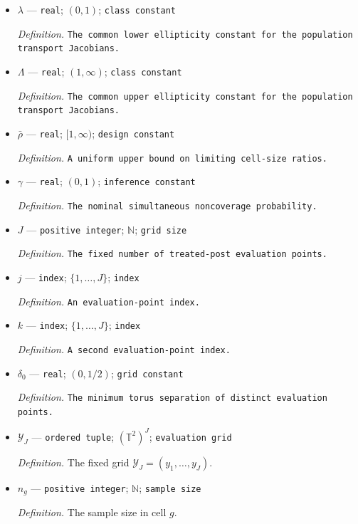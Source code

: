\documentclass{article}
\begin{document}
\begin{itemize}
  \item \(\lambda\) --- \texttt{real}; \((0,1)\); \texttt{class constant}
  \par\smallskip\noindent\emph{Definition.} \texttt{The common lower ellipticity constant for the population transport Jacobians.}
  \item \(\Lambda\) --- \texttt{real}; \((1,\infty)\); \texttt{class constant}
  \par\smallskip\noindent\emph{Definition.} \texttt{The common upper ellipticity constant for the population transport Jacobians.}
  \item \(\bar\rho\) --- \texttt{real}; \([1,\infty)\); \texttt{design constant}
  \par\smallskip\noindent\emph{Definition.} \texttt{A uniform upper bound on limiting cell-\allowbreak{}size ratios.}
  \item \(\gamma\) --- \texttt{real}; \((0,1)\); \texttt{inference constant}
  \par\smallskip\noindent\emph{Definition.} \texttt{The nominal simultaneous noncoverage probability.}
  \item \(J\) --- \texttt{positive integer}; \(\mathbb N\); \texttt{grid size}
  \par\smallskip\noindent\emph{Definition.} \texttt{The fixed number of treated-\allowbreak{}post evaluation points.}
  \item \(j\) --- \texttt{index}; \(\{1,\ldots,J\}\); \texttt{index}
  \par\smallskip\noindent\emph{Definition.} \texttt{An evaluation-\allowbreak{}point index.}
  \item \(k\) --- \texttt{index}; \(\{1,\ldots,J\}\); \texttt{index}
  \par\smallskip\noindent\emph{Definition.} \texttt{A second evaluation-\allowbreak{}point index.}
  \item \(\delta_0\) --- \texttt{real}; \((0,1/2)\); \texttt{grid constant}
  \par\smallskip\noindent\emph{Definition.} \texttt{The minimum torus separation of distinct evaluation points.}
  \item \(\mathcal Y_J\) --- \texttt{ordered tuple}; \((\mathbb T^2)^J\); \texttt{evaluation grid}
  \par\smallskip\noindent\emph{Definition.} The fixed grid \(\mathcal Y_J=(y_1,\ldots,y_J)\).
  \item \(n_g\) --- \texttt{positive integer}; \(\mathbb N\); \texttt{sample size}
  \par\smallskip\noindent\emph{Definition.} The sample size in cell \(g\).

\end{itemize}
\end{document}
